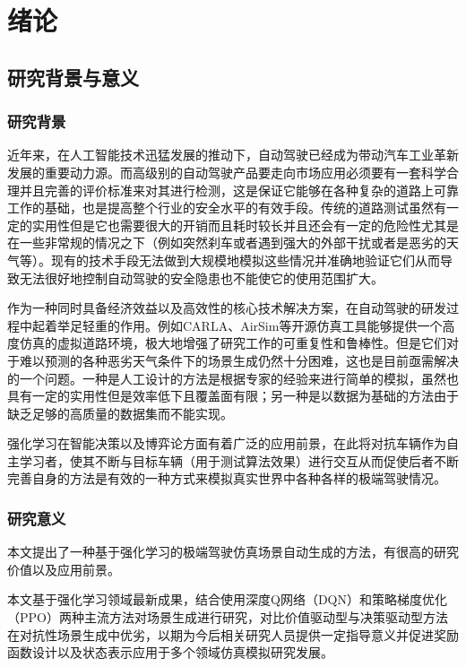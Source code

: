 \chapter{绪论}

\section{研究背景与意义}
\subsection{研究背景}

近年来，在人工智能技术迅猛发展的推动下，自动驾驶已经成为带动汽车工业革新发展的重要动力源。而高级别的自动驾驶产品要走向市场应用必须要有一套科学合理并且完善的评价标准来对其进行检测，这是保证它能够在各种复杂的道路上可靠工作的基础，也是提高整个行业的安全水平的有效手段。传统的道路测试虽然有一定的实用性但是它也需要很大的开销而且耗时较长并且还会有一定的危险性尤其是在一些非常规的情况之下（例如突然刹车或者遇到强大的外部干扰或者是恶劣的天气等）。现有的技术手段无法做到大规模地模拟这些情况并准确地验证它们从而导致无法很好地控制自动驾驶的安全隐患也不能使它的使用范围扩大\cite{sun2025autonomous}。

作为一种同时具备经济效益以及高效性的核心技术解决方案，在自动驾驶的研发过程中起着举足轻重的作用。例如CARLA、AirSim等开源仿真工具能够提供一个高度仿真的虚拟道路环境，极大地增强了研究工作的可重复性和鲁棒性。但是它们对于难以预测的各种恶劣天气条件下的场景生成仍然十分困难，这也是目前亟需解决的一个问题。一种是人工设计的方法是根据专家的经验来进行简单的模拟，虽然也具有一定的实用性但是效率低下且覆盖面有限；另一种是以数据为基础的方法由于缺乏足够的高质量的数据集而不能实现\cite{yang2025lane}。

强化学习在智能决策以及博弈论方面有着广泛的应用前景，在此将对抗车辆作为自主学习者，使其不断与目标车辆（用于测试算法效果）进行交互从而促使后者不断完善自身的方法是有效的一种方式来模拟真实世界中各种各样的极端驾驶情况。

\subsection{研究意义}

本文提出了一种基于强化学习的极端驾驶仿真场景自动生成的方法，有很高的研究价值以及应用前景。

本文基于强化学习领域最新成果，结合使用深度Q网络（DQN）和策略梯度优化（PPO）两种主流方法对场景生成进行研究，对比价值驱动型与决策驱动型方法在对抗性场景生成中优劣，以期为今后相关研究人员提供一定指导意义并促进奖励函数设计以及状态表示应用于多个领域仿真模拟研究发展。

